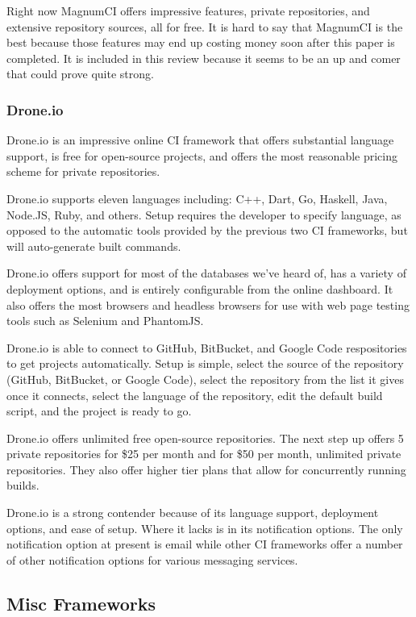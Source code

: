 \documentclass[11pt]{article}
\begin{document}
Right now MagnumCI offers impressive features, private repositories, and extensive repository sources, all for free. It is hard to say that MagnumCI is the best because those features may end up costing money soon after this paper is completed. It is included in this review because it seems to be an up and comer that could prove quite strong.

\subsubsection{Drone.io \cite{DroneIO}}
Drone.io is an impressive online CI framework that offers substantial language support, is free for open-source projects, and offers the most reasonable pricing scheme for private repositories.

Drone.io supports eleven languages including: C++, Dart, Go, Haskell, Java, Node.JS, Ruby, and others. Setup requires the developer to specify language, as opposed to the automatic tools provided by the previous two CI frameworks, but will auto-generate built commands.

Drone.io offers support for most of the databases we've heard of, has a variety of deployment options, and is entirely configurable from the online dashboard. It also offers the most browsers and headless browsers for use with web page testing tools such as Selenium and PhantomJS.

Drone.io is able to connect to GitHub, BitBucket, and Google Code respositories to get projects automatically. Setup is simple, select the source of the repository (GitHub, BitBucket, or Google Code), select the repository from the list it gives once it connects, select the language of the repository, edit the default build script, and the project is ready to go.

Drone.io offers unlimited free open-source repositories. The next step up offers 5 private repositories for \$25 per month and for \$50 per month, unlimited private repositories. They also offer higher tier plans that allow for concurrently running builds.

Drone.io is a strong contender because of its language support, deployment options, and ease of setup. Where it lacks is in its notification options. The only notification option at present is email while other CI frameworks offer a number of other notification options for various messaging services.


\subsection{Misc Frameworks}
\end{document}
